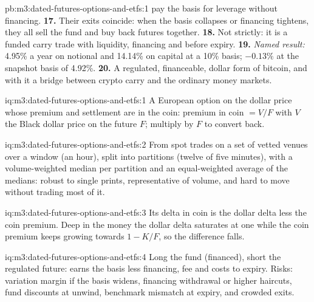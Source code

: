 \begin{solution}{pb:m3:dated-futures-options-and-etfs:1}
pay the basis for leverage without financing. \textbf{17.} Their exits coincide: when the basis collapses or financing tightens, they
all sell the fund and buy back futures together. \textbf{18.} Not strictly: it is a funded carry trade with liquidity, financing and
 before expiry. \textbf{19.} \emph{Named result:} 4.95\% a year on notional and 14.14\% on capital at a 10\% basis; $-0.13\%$
at the snapshot basis of 4.92\%. \textbf{20.} A regulated, financeable, dollar form of bitcoin, and with it a bridge between crypto
carry and the ordinary money markets.
\end{solution}

\begin{solution}{iq:m3:dated-futures-options-and-etfs:1}
A European option on the dollar price whose premium and settlement are in the coin: premium in coin $= V/F$ with $V$ the Black dollar
price on the future $F$; multiply by $F$ to convert back.
\end{solution}

\begin{solution}{iq:m3:dated-futures-options-and-etfs:2}
From spot trades on a set of vetted venues over a window (an hour), split into partitions (twelve of five minutes), with a
volume-weighted median per partition and an equal-weighted average of the medians: robust to single prints, representative of
volume, and hard to move without trading most of it.
\end{solution}

\begin{solution}{iq:m3:dated-futures-options-and-etfs:3}
Its delta in coin is the dollar delta less the coin premium. Deep in the money the dollar delta saturates at one while the coin premium
keeps growing towards $1 - K/F$, so the difference falls.
\end{solution}

\begin{solution}{iq:m3:dated-futures-options-and-etfs:4}
Long the fund (financed), short the regulated future: earns the basis less financing, fee and costs to expiry. Risks: variation margin if
the basis widens, financing withdrawal or higher haircuts, fund discounts at unwind, benchmark mismatch at expiry, and crowded exits.
\end{solution}

